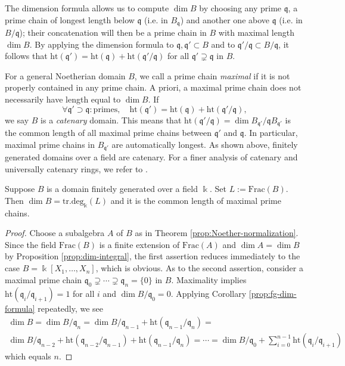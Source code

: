 The dimension formula allows us to compute $\dim B$ by choosing any prime $\mathfrak{q}$, a prime chain of longest length below $\mathfrak{q}$ (i.e. in $B_{\mathfrak{q}}$) and another one above $\mathfrak{q}$ (i.e. in $B/\mathfrak{q}$); their concatenation will then be a prime chain in $B$ with maximal length $\dim B$. By applying the dimension formula to $\mathfrak{q}, \mathfrak{q}' \subset B$ and to $\mathfrak{q}'/\mathfrak{q} \subset B/\mathfrak{q}$, it follows that $\text{ht}(\mathfrak{q}') = \text{ht}(\mathfrak{q}) + \text{ht}(\mathfrak{q}'/\mathfrak{q})$ for all $\mathfrak{q}' \supsetneq \mathfrak{q}$ in $B$.

For a general Noetherian domain $B$, we call a prime chain \emph{maximal} if it is not properly contained in any prime chain. A priori, a maximal prime chain does not necessarily have length equal to $\dim B$. If
\[ \forall \mathfrak{q}' \supset \mathfrak{q}: \text{primes}, \quad \text{ht}(\mathfrak{q}') = \text{ht}(\mathfrak{q}) + \text{ht}(\mathfrak{q}'/\mathfrak{q}), \]
we say $B$ is a \emph{catenary} domain. This means that $\text{ht}(\mathfrak{q}'/\mathfrak{q}) = \dim B_{\mathfrak{q}'}/\mathfrak{q}B_{\mathfrak{q}'}$ is the common length of all maximal prime chains between $\mathfrak{q}'$ and $\mathfrak{q}$. In particular, maximal prime chains in $B_{\mathfrak{q}'}$ are automatically longest. As shown above, finitely generated domains over a field are catenary. For a finer analysis of catenary and universally catenary rings, we refer to \cite[\S 14]{Mat80}.

\begin{corollary}
	Suppose $B$ is a domain finitely generated over a field $\Bbbk$. Set $L := \mathrm{Frac}(B)$. Then $\dim B = \mathrm{tr.deg}_\Bbbk(L)$ and it is the common length of maximal prime chains.
\end{corollary}
\begin{proof}
	Choose a subalgebra $A$ of $B$ as in Theorem \ref{prop:Noether-normalization}. Since the field $\text{Frac}(B)$ is a finite extension of $\text{Frac}(A)$ and $\dim A = \dim B$ by Proposition \ref{prop:dim-integral}, the first assertion reduces immediately to the case $B = \Bbbk[X_1, \ldots, X_n]$, which is obvious. As to the second assertion, consider a maximal prime chain $\mathfrak{q}_0 \supsetneq \cdots \supsetneq \mathfrak{q}_n = \{0\}$ in $B$. Maximality implies $\text{ht}(\mathfrak{q}_i/\mathfrak{q}_{i+1}) = 1$ for all $i$ and $\dim B/\mathfrak{q}_0 = 0$. Applying Corollary \ref{prop:fg-dim-formula} repeatedly, we see
	\begin{multline*}
		\dim B = \dim B/\mathfrak{q}_n = \dim B/\mathfrak{q}_{n-1} + \text{ht}(\mathfrak{q}_{n-1}/\mathfrak{q}_n) = \\
		\dim B/\mathfrak{q}_{n-2} + \text{ht}(\mathfrak{q}_{n-2}/\mathfrak{q}_{n-1}) + \text{ht}(\mathfrak{q}_{n-1}/\mathfrak{q}_n) = \cdots = \dim B/\mathfrak{q}_0 + \sum_{i=0}^{n-1} \text{ht}(\mathfrak{q}_i/\mathfrak{q}_{i+1})
	\end{multline*}
	which equals $n$.
\end{proof}

